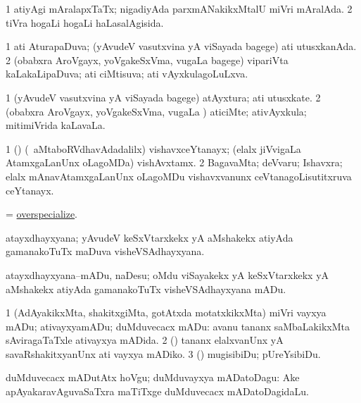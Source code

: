 \bentry
{}
\gl{\gu}
\bmng
\bnum
\num{1} atiyAgi mAralapxTaTx; nigadiyAda parxmANakikxMtalU miVri mAralAda. 
\num{2} tiVra hogaLi hogaLi haLasalAgisida. 
\enum
\emng
\eentry


\bentry
{}
\gl{\gu}
\bmng
\bnum
\num{1} ati AturapaDuva; (yAvudeV vasutxvina yA viSayada bagege) ati utusxkanAda. 
\num{2} (obabxra AroVgayx, yoVgakeSxVma, \mo vugaLa bagege) vipariVta kaLakaLipaDuva; ati ciMtisuva; ati vAyxkulagoLuLxva. 
\enum
\emng
\eentry


\bentry
{}
\gl{\nA}
\bmng
\bnum
\num{1} (yAvudeV vasutxvina yA viSayada bagege) atAyxtura; ati utusxkate. 
\num{2} (obabxra AroVgayx, yoVgakeSxVma, \mo vugaLa \vi) aticiMte; ativAyxkula; mitimiVrida kaLavaLa. 
\enum
\emng
\eentry


\bentry
{}
\gl{\nA}
\bmng
\bnum
\num{1} (\tashA) (\kanmu\ aMtaboRVdhavAdadalilx) vishavxceYtanayx; (elalx jiVvigaLa AtamxgaLanUnx oLagoMDa) vishAvxtamx. 
\num{2} BagavaMta; deVvaru; Ishavxra; elalx mAnavAtamxgaLanUnx oLagoMDu vishavxvanunx ceVtanagoLisutitxruva ceYtanayx. 
\enum
\emng
\eentry


\bentry
{}
\gl{\akirx}
\bmng
= \hyperlink{overspecialize}{overspecialize}. 
\emng
\eentry


\bentry
{}
\gl{\nA}
\bmng
atayxdhayxyana; yAvudeV keSxVtarxkekx yA aMshakekx atiyAda gamanakoTuTx maDuva visheVSAdhayxyana. 
\emng
\eentry


\bentry
{}
\gl{\akirx}
\bmng
atayxdhayxyana--mADu, naDesu; oMdu viSayakekx yA keSxVtarxkekx yA aMshakekx atiyAda gamanakoTuTx visheVSAdhayxyana mADu. 
\emng
\eentry


\bentry
{}
\gl{\kirx}


\noindent
\gl{\sakirx}
\bmng
\bnum
\num{1} (AdAyakikxMta, shakitxgiMta, gotAtxda motatxkikxMta) miVri vayxya mADu; ativayxyamADu; duMduvecacx mADu:  avanu tananx saMbaLakikxMta sAviragaTaTxle ativayxya mADida. 
\num{2} (\AtAmx) tananx elalxvanUnx yA savaRshakitxyanUnx ati vayxya mADiko. 
\num{3} (\pArxparx) mugisibiDu; pUreYsibiDu. 
\enum
\emng

\noindent
\gl{\akirx}
\bmng
duMduvecacx mADutAtx hoVgu; duMduvayxya mADatoDagu:  Ake apAyakaravAguvaSaTxra maTiTxge duMduvecacx mADatoDagidaLu. 
\emng
\eentry


